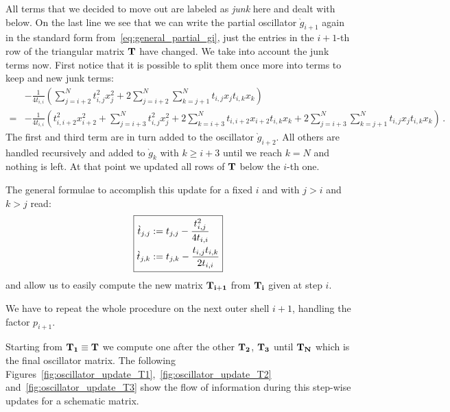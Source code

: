 \documentclass[a4paper,10pt]{article}
\begin{document}
All terms that we decided to move out are labeled as \emph{junk} here and dealt
with below.
On the last line we see that we can write the partial oscillator $\grave{g}_{i+1}$
again in the standard form from~\eqref{eq:general_partial_gi}, just the
entries in the $i+1$-th row of the triangular matrix $\mathbf{T}$ have changed.
We take into account the junk terms now. First notice that it is possible
to split them once more into terms to keep and new junk terms:
\begin{equation*}
\begin{split}
  & - \frac{1}{4 t_{i,i}}
      \left(
        \sum_{j=i+2}^{N} t_{i,j}^2 x_j^2
        +
        2 \sum_{j=i+2}^{N} \sum_{k=j+1}^{N} t_{i,j} x_j t_{i,k} x_k
      \right) \\
  = & - \frac{1}{4 t_{i,i}}
      \left(
        t_{i,i+2}^2 x_{i+2}^2
        +
        \sum_{j=i+3}^{N} t_{i,j}^2 x_j^2
        +
        2 \sum_{k=i+3}^{N} t_{i,i+2} x_{i+2} t_{i,k} x_k
        +
        2 \sum_{j=i+3}^{N} \sum_{k=j+1}^{N} t_{i,j} x_j t_{i,k} x_k
      \right) \,.
\end{split}
\end{equation*}
The first and third term are in turn added to the oscillator $\grave{g}_{i+2}$.
All others are handled recursively and added to $\grave{g}_{k}$ with $k \geq i+3$
until we reach $k=N$ and nothing is left. At that point we updated all
rows of $\mathbf{T}$ below the $i$-th one.

The general formulae to accomplish this update for a fixed $i$ and
with $j > i$ and $k > j$ read:
\begin{equation}\label{eq:matrix_update_formulae}
\boxed{
\begin{aligned}
  \grave{t}_{j,j} & := t_{j,j} - \frac{t_{i,j}^2}{4 t_{i,i}} \\
  \grave{t}_{j,k} & := t_{j,k} - \frac{t_{i,j} t_{i,k}}{2 t_{i,i}}
\end{aligned}
}
\end{equation}
and allow us to easily compute the new matrix $\mathbf{T_{i+1}}$ from
$\mathbf{T_i}$ given at step $i$.

We have to repeat the whole procedure on the next outer shell $i+1$,
handling the factor $p_{i+1}$.

Starting from $\mathbf{T_1} \equiv \mathbf{T}$ we compute one after the other
$\mathbf{T_2}$, $\mathbf{T_3}$ until $\mathbf{T_N}$ which is the final oscillator
matrix. The following Figures~\ref{fig:oscillator_update_T1},~\ref{fig:oscillator_update_T2}
and~\ref{fig:oscillator_update_T3} show the flow of information during this
step-wise updates for a schematic matrix.
\end{document}
